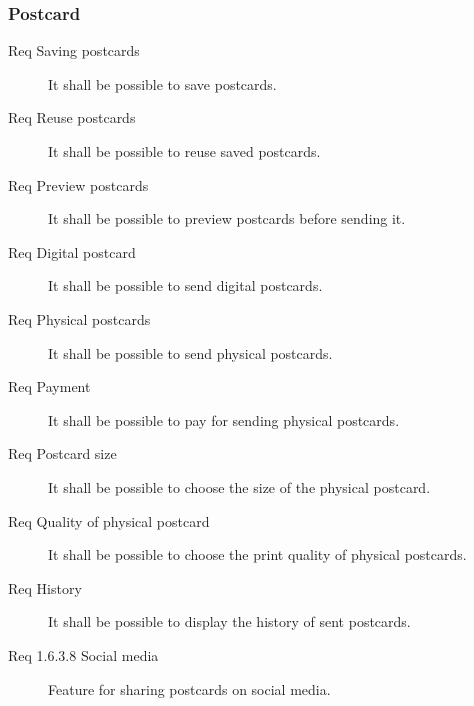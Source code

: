 \documentclass[10pt,a4paper]{article}
\begin{document}
\subsubsection{Postcard}
\begin{description}
	\item [Req  Saving postcards] It shall be possible to save postcards.
	\item [Req  Reuse postcards] It shall be possible to reuse saved postcards.
	
	\item [Req  Preview postcards] It shall be possible to preview postcards before sending it.
	
	\item [Req  Digital postcard] It shall be possible to send digital postcards.
	\item [Req  Physical postcards] It shall be possible to send physical postcards.
	
	\item [Req  Payment] It shall be possible to pay for sending physical postcards.
	
	\item [Req  Postcard size] It shall be possible to choose the size of the physical postcard.
	\item [Req  Quality of physical postcard] It shall be possible to choose the print quality of physical postcards. 
	\item [Req  History] It shall be possible to display the history of sent postcards.
	
	\item [Req 1.6.3.8 Social media] Feature for sharing postcards on social media.
	

		


\end{description}
\end{document}
